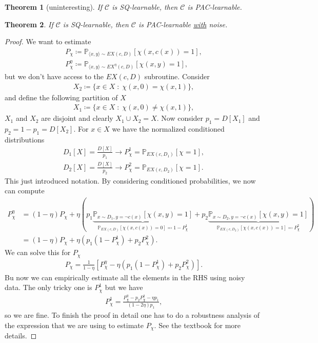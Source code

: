 \documentclass[12pt, letterpaper]{article}
\numberwithin{equation}{section} %
\newcommand{\ul}{\underline}
\newcommand{\mb}{\mathbb}
\newcommand{\mc}{\mathcal}
\newtheorem{theorem}{Theorem}[section]
\theoremstyle{definition}
\theoremstyle{remark}
\begin{document}
\begin{theorem}[uninteresting]
    If $\mc C$ is SQ-learnable, then $\mc C$ is PAC-learnable.
\end{theorem}

\begin{theorem}
    If $\mc C$ is SQ-learnable, then $\mc C$ is PAC-learnable \ul{with} noise.
\end{theorem}
\begin{proof}
    We want to estimate
    \begin{align}
    P_\chi \coloneqq \mb P_{\langle x,y\rangle\sim EX(c,D)}[\chi(x,c(x))=1],\\
    P_\chi^\eta \coloneqq \mb P_{\langle x,y\rangle\sim EX^\eta(c,D)}[\chi(x,y)=1],
    \end{align}
    but we don't have access to the $EX(c,D)$ subroutine. Consider
    \begin{align}
    X_2 \coloneqq \lbrace x\in X \;:\; \chi(x,0)= \chi(x,1)\rbrace,
    \end{align}
    and define the following partition of $X$
    \begin{align}
    X_1 \coloneqq \lbrace x\in X \;:\; \chi(x,0)\ne \chi(x,1)\rbrace,
    \end{align}
    $X_1$ and $X_2$ are disjoint and clearly  $X_1\cup X_2 = X$. Now consider $p_1 = D[X_1]$ and $p_2 = 1 - p_1 =  D[X_2]$. For $x\in X$ we have the normalized conditioned distributions
    \begin{align}
    D_1[X] = \frac{D[X]}{p_1}\rightarrow P_\chi^1 = \mb P_{EX(c,D_1)}[\chi=1],\\
    D_2[X] = \frac{D[X]}{p_2}\rightarrow P_\chi^2 = \mb P_{EX(c,D_2)}[\chi=1].
    \end{align}
    This just introduced notation. By considering conditioned probabilities, we now can compute
    \begin{align}
    P_\chi^\eta &= (1-\eta)P_\chi + \eta\left(p_1\underbrace{\mb P_{x\sim D_1,y=\lnot c(x)}[\chi(x,y)=1]}_{\mb P_{EX(c,D)}[\chi(x, c(x))=0] \eqqcolon 1 - P_\chi^1} + p_2\underbrace{\mb P_{x\sim D_2,y=\lnot c(x)}[\chi(x,y)=1]}_{\mb P_{EX(c,D_2)}[\chi(x,c(x))=1] \eqqcolon P_\chi^2}\right)\\
    &=(1-\eta)P_\chi + \eta\left(p_1(1 - P_\chi^1) + p_2 P_\chi^2\right).
    \end{align}
    We can solve this for $P_\chi$
    \begin{align}
    P_\chi = \frac1{1-\eta}\left[P_\chi^\eta -\eta\left(p_1(1 - P_\chi^1) + p_2 P_\chi^2\right)\right].
    \end{align}
    Bu now we can empirically estimate all the elements in the RHS using noisy data. The only tricky one is $P_\chi^1$ but we have
    \begin{align}
    P_\chi^1 = \frac{P_\chi^\eta - p_2P_\chi^2 -\eta p_1}{(1-2\eta)p_1},
    \end{align}
    so we are fine. To finish the proof in detail one has to do a robustness analysis of the expression that we are using to estimate $P_\chi$. See the textbook for more details.
\end{proof}
\end{document}
